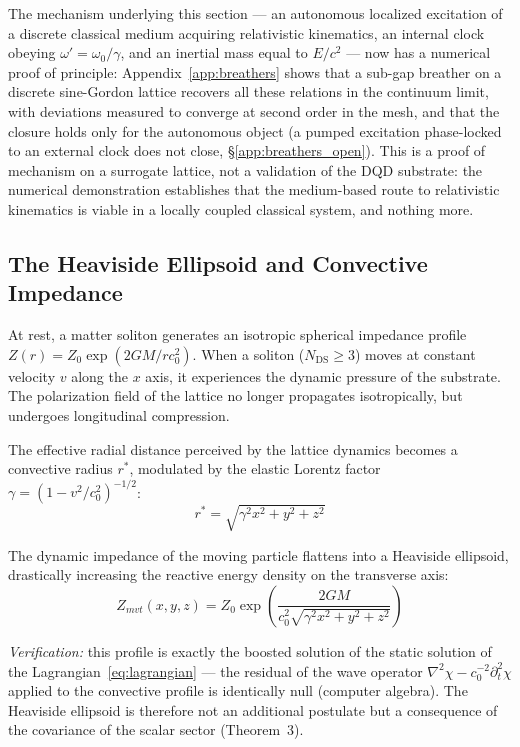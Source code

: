 \documentclass[11pt,a4paper]{article}
\theoremstyle{plain}
\theoremstyle{remark}
\newcommand{\Ncd}{\ensuremath{N_{\mathrm{DS}}}}
\begin{document}
The mechanism underlying this section --- an autonomous localized excitation of a discrete classical medium acquiring relativistic kinematics, an internal clock obeying $\omega' = \omega_0/\gamma$, and an inertial mass equal to $E/c^2$ --- now has a numerical proof of principle: Appendix~\ref{app:breathers} shows that a sub-gap breather on a discrete sine-Gordon lattice recovers all these relations in the continuum limit, with deviations measured to converge at second order in the mesh, and that the closure holds only for the autonomous object (a pumped excitation phase-locked to an external clock does not close, \S\ref{app:breathers_open}). This is a proof of mechanism on a surrogate lattice, not a validation of the DQD substrate: the numerical demonstration establishes that the medium-based route to relativistic kinematics is viable in a locally coupled classical system, and nothing more.

\subsection{The Heaviside Ellipsoid and Convective Impedance}

At rest, a matter soliton generates an isotropic spherical impedance profile $Z(r) = Z_0 \exp(2GM/rc_0^2)$. When a soliton ($\Ncd \ge 3$) moves at constant velocity $v$ along the $x$ axis, it experiences the dynamic pressure of the substrate. The polarization field of the lattice no longer propagates isotropically, but undergoes longitudinal compression.

The effective radial distance perceived by the lattice dynamics becomes a convective radius $r^*$, modulated by the elastic Lorentz factor $\gamma = (1 - v^2/c_0^2)^{-1/2}$:
\begin{equation}
r^* = \sqrt{\gamma^2 x^2 + y^2 + z^2}
\end{equation}

The dynamic impedance of the moving particle flattens into a Heaviside ellipsoid, drastically increasing the reactive energy density on the transverse axis:
\begin{equation}
Z_{mvt}(x,y,z) = Z_0 \exp\left( \frac{2GM}{c_0^2 \sqrt{\gamma^2 x^2 + y^2 + z^2}} \right)
\end{equation}

\emph{Verification:} this profile is exactly the boosted solution of the static solution of the Lagrangian~\eqref{eq:lagrangian} --- the residual of the wave operator $\nabla^2\chi - c_0^{-2}\partial_t^2\chi$ applied to the convective profile is identically null (computer algebra). The Heaviside ellipsoid is therefore not an additional postulate but a consequence of the covariance of the scalar sector (Theorem~3).
\end{document}
